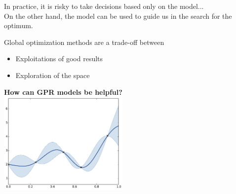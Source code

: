 \begin{frame}{}
\begin{figure}
    \end{figure}
In practice, it is risky to take decisions based only on the model...\\
\vspace{3mm}
On the other hand, the model can be used to guide us in the search for the optimum.
\end{frame}

\begin{frame}{}
Global optimization methods are a trade-off between
\begin{itemize}
	\item Exploitations of good results
	\item Exploration of the space
\end{itemize}
\vspace{3mm}
\begin{center}
\textbf{How can GPR models be helpful?}\\
\includegraphics[height=5cm]{4_optimization/figures/python/ego_0}
\end{center}
\end{frame}

